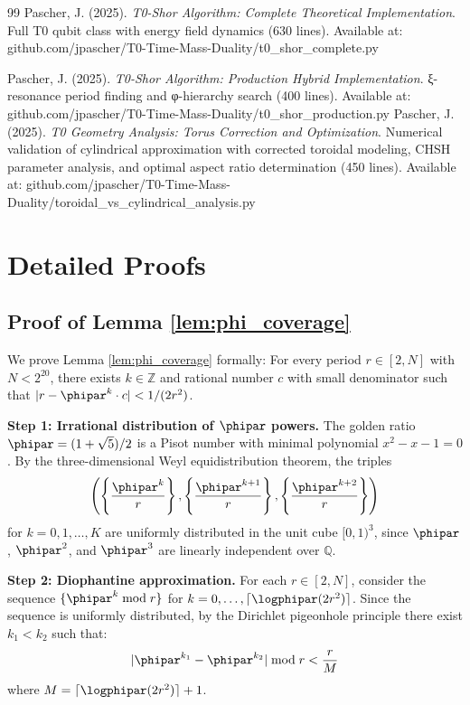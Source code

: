 \begin{thebibliography}{99}
	Pascher, J. (2025). 
	\textit{T0-Shor Algorithm: Complete Theoretical Implementation}. 
	Full T0 qubit class with energy field dynamics (630 lines). Available at: github.com/jpascher/T0-Time-Mass-Duality/t0\_shor\_complete.py
	
	Pascher, J. (2025). 
	\textit{T0-Shor Algorithm: Production Hybrid Implementation}. 
	ξ-resonance period finding and φ-hierarchy search (400 lines). Available at: github.com/jpascher/T0-Time-Mass-Duality/t0\_shor\_production.py
	Pascher, J. (2025). 
	\textit{T0 Geometry Analysis: Torus Correction and Optimization}. 
	Numerical validation of cylindrical approximation with corrected toroidal modeling, CHSH parameter analysis, and optimal aspect ratio determination (450 lines). Available at: github.com/jpascher/T0-Time-Mass-Duality/toroidal\_vs\_cylindrical\_analysis.py
\end{thebibliography}

\appendix

\section{Detailed Proofs}
\label{app:proofs}

\subsection{Proof of Lemma \ref{lem:phi_coverage}}
\label{app:proof_phi_coverage}

We prove Lemma \ref{lem:phi_coverage} formally: For every period $r \in [2, N]$ with $N < 2^{20}$, there exists $k \in \mathbb{Z}$ and rational number $c$ with small denominator such that $|r - \phipar^k \cdot c| < 1/(2r^2)$.

\textbf{Step 1: Irrational distribution of $\phipar$ powers.}
The golden ratio $\phipar = (1+\sqrt{5})/2$ is a Pisot number with minimal polynomial $x^2 - x - 1 = 0$. By the three-dimensional Weyl equidistribution theorem, the triples
\[
\left(\left\{\frac{\phipar^k}{r}\right\}, \left\{\frac{\phipar^{k+1}}{r}\right\}, \left\{\frac{\phipar^{k+2}}{r}\right\}\right)
\]
for $k = 0, 1, \ldots, K$ are uniformly distributed in the unit cube $[0,1)^3$, since $\phipar$, $\phipar^2$, and $\phipar^3$ are linearly independent over $\mathbb{Q}$.

\textbf{Step 2: Diophantine approximation.}
For each $r \in [2, N]$, consider the sequence $\{\phipar^k \bmod r\}$ for $k = 0, \ldots, \lceil \logphipar(2r^2)\rceil$. Since the sequence is uniformly distributed, by the Dirichlet pigeonhole principle there exist $k_1 < k_2$ such that:
\[
|\phipar^{k_1} - \phipar^{k_2}| \bmod r < \frac{r}{M}
\]
where $M = \lceil \logphipar(2r^2)\rceil + 1$.

